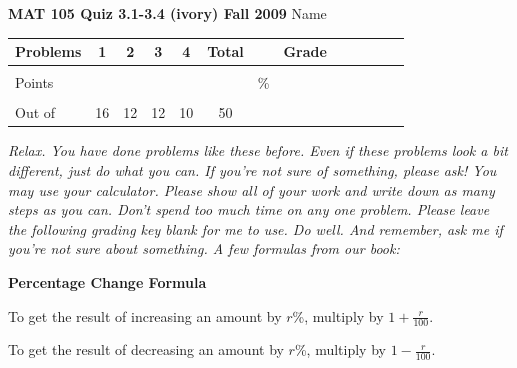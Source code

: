 \documentclass[12pt]{article}
\begin{document}
{\bf MAT 105 Quiz 3.1-3.4 (ivory) Fall 2009} \hspace{.4in} {\large Name} \hrulefill

\hrulefill


\begin{center}

\begin{tabular}
{|l|c|c|c|c|c|c|c|c|c|c|c|c|} \hline

 Problems & \hspace{5 pt} 1 \hspace{5 pt}  & \hspace{5 pt} 2 \hspace{5 pt} & \hspace{5 pt} 3 \hspace{5 pt} & \hspace{5 pt} 4 \hspace{5 pt} &  \hspace{5 pt} Total  \hspace{5 pt} & &  \hspace{5 pt} Grade \hspace{5 pt}  \\ \hline
&&&&& &&\\  
Points &&&&& &    \hspace{.8in}\% &  \\ 
&&&&& && \\  \hline
Out of & 16 & 12  & 12 & 10 &50 & & \\ \hline

\end {tabular}
 
\end{center}

 \emph{Relax.  You have done problems like these before.  Even if these problems look a bit different, just do what you can.  If you're not sure of something, please ask! You may use your calculator.  Please show all of your work and write down as many steps as you can.  Don't spend too much time on any one problem.  Please leave the following grading key blank for me to use.  Do well.  And remember, ask me if you're not sure about something. A few formulas from our book:}
  \vspace{.2in}
 
  \begin{center}
\textbf{Percentage Change Formula}
\vspace{.1in}

To get the result of increasing an amount by $r$\%, multiply by $1+\frac{r}{100}.$
\vspace{.1in}

To get the result of decreasing an amount by $r$\%, multiply by $1-\frac{r}{100}.$
 \end{center}
 
\end{document}
